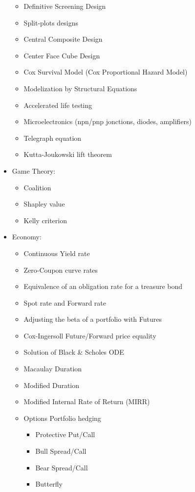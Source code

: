 \begin{itemize}
\begin{itemize}
				\item Definitive Screening Design
				\item Split-plots designs				
				\item Central Composite Design
				\item Center Face Cube Design
				\item Cox Survival Model (Cox Proportional Hazard Model)
				\item Modelization by Structural Equations				
				\item Accelerated life testing
				\item Microelectronics (npn/pnp jonctions, diodes, amplifiers)
				\item Telegraph equation
				\item Kutta-Joukowski lift theorem
			\end{itemize} 
		\item Game Theory: 
			\begin{itemize}
				\item Coalition
				\item Shapley value
				\item Kelly criterion 
			\end{itemize}
		\item Economy: 
			\begin{itemize}
				\item Continuous Yield rate
				\item Zero-Coupon curve rates
				\item Equivalence of an obligation rate for a treasure bond
				\item Spot rate and Forward rate
				\item Adjusting the beta of a portfolio with Futures
				\item Cox-Ingersoll Future/Forward price equality 
				\item Solution of Black \& Scholes ODE
				\item Macaulay Duration 
				\item Modified Duration
				\item Modified Internal Rate of Return (MIRR)
				\item Options Portfolio hedging
				\begin{itemize}
					\item Protective Put/Call
					\item Bull Spread/Call
					\item Bear Spread/Call
					\item Butterfly

\end{itemize}
\end{itemize}
\end{itemize}
